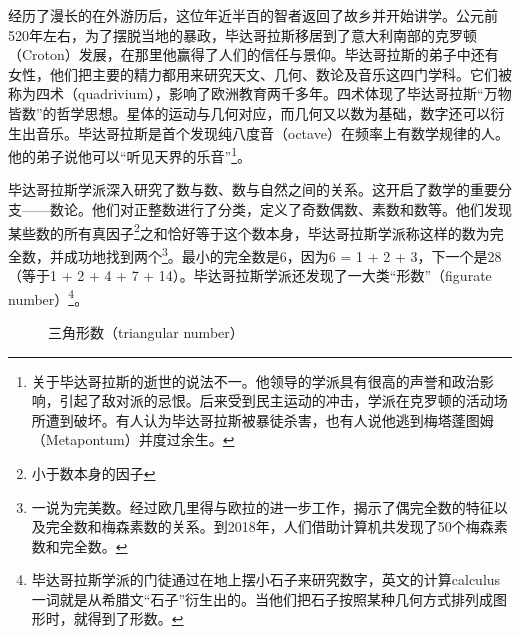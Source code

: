 \documentclass[UTF8]{article}
\begin{document}
经历了漫长的在外游历后，这位年近半百的智者返回了故乡并开始讲学。公元前520年左右，为了摆脱当地的暴政，毕达哥拉斯移居到了意大利南部的克罗顿（Croton）发展，在那里他赢得了人们的信任与景仰。毕达哥拉斯的弟子中还有女性，他们把主要的精力都用来研究天文、几何、数论及音乐这四门学科。它们被称为四术（quadrivium），影响了欧洲教育两千多年\cite{StepanovRose15}。四术体现了毕达哥拉斯“万物皆数”的哲学思想。星体的运动与几何对应，而几何又以数为基础，数字还可以衍生出音乐。毕达哥拉斯是首个发现纯八度音（octave）在频率上有数学规律的人。他的弟子说他可以“听见天界的乐音”\footnote{关于毕达哥拉斯的逝世的说法不一。他领导的学派具有很高的声誉和政治影响，引起了敌对派的忌恨。后来受到民主运动的冲击，学派在克罗顿的活动场所遭到破坏。有人认为毕达哥拉斯被暴徒杀害，也有人说他逃到梅塔蓬图姆（Metapontum）并度过余生。}。

毕达哥拉斯学派深入研究了数与数、数与自然之间的关系。这开启了数学的重要分支——数论。他们对正整数进行了分类，定义了奇数偶数、素数和数等。他们发现某些数的所有真因子\footnote{小于数本身的因子}之和恰好等于这个数本身，毕达哥拉斯学派称这样的数为完全数，并成功地找到两个\footnote{一说为完美数。经过欧几里得与欧拉的进一步工作，揭示了偶完全数的特征以及完全数和梅森素数的关系。到2018年，人们借助计算机共发现了50个梅森素数和完全数。}。最小的完全数是6，因为6 = 1 + 2 + 3，下一个是28（等于1 + 2 + 4 + 7 + 14）。毕达哥拉斯学派还发现了一大类“形数”（figurate number）\footnote{毕达哥拉斯学派的门徒通过在地上摆小石子来研究数字，英文的计算calculus一词就是从希腊文“石子”衍生出的\cite{HanXueTao16}。当他们把石子按照某种几何方式排列成图形时，就得到了形数。}。

\begin{figure}[htbp]
\centering
{}
\caption{三角形数（triangular number）}
\label{fig:triangular-num}
\end{figure}
\end{document}
